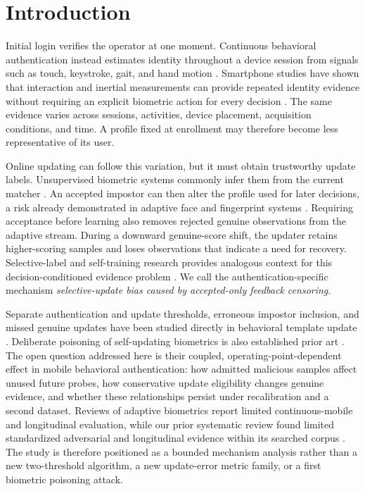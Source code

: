 \documentclass[technologies,article,submit,moreauthors]{Definitions/mdpi}
\begin{document}
\section{Introduction}\label{sec:introduction}

Initial login verifies the operator at one moment. Continuous behavioral authentication instead estimates identity throughout a device session from signals such as touch, keystroke, gait, and hand motion \cite{Mahfouz2017SmartphoneSurvey,Abuhamad2021SensorSurvey,Stylios2021MobileSurvey}. Smartphone studies have shown that interaction and inertial measurements can provide repeated identity evidence without requiring an explicit biometric action for every decision \cite{Frank2013Touchalytics,Sitova2016HMOG,Fereidooni2023AuthentiSense}. The same evidence varies across sessions, activities, device placement, acquisition conditions, and time. A profile fixed at enrollment may therefore become less representative of its user.

Online updating can follow this variation, but it must obtain trustworthy update labels. Unsupervised biometric systems commonly infer them from the current matcher \cite{Rattani2009TemplateUpdate,Didaci2014UnsupervisedUpdate}. An accepted impostor can then alter the profile used for later decisions, a risk already demonstrated in adaptive face and fingerprint systems \cite{Biggio2012PoisoningAdaptive,Biggio2013FacePoisoning,Lovisotto2020BiometricBackdoors,Xue2020LOPA}. Requiring acceptance before learning also removes rejected genuine observations from the adaptive stream. During a downward genuine-score shift, the updater retains higher-scoring samples and loses observations that indicate a need for recovery. Selective-label and self-training research provides analogous context for this decision-conditioned evidence problem \cite{Lakkaraju2017SelectiveLabels,Arazo2020ConfirmationBias,Perdomo2020PerformativePrediction}. We call the authentication-specific mechanism \emph{selective-update bias caused by accepted-only feedback censoring}.

Separate authentication and update thresholds, erroneous impostor inclusion, and missed genuine updates have been studied directly in behavioral template update \cite{Giot2011KeystrokeUpdate,Giot2012HybridTemplateUpdate,Giot2012TemplateUpdateEvaluation}. Deliberate poisoning of self-updating biometrics is also established prior art \cite{Biggio2012PoisoningAdaptive,Biggio2013FacePoisoning,Lovisotto2020BiometricBackdoors,Xue2020LOPA}. The open question addressed here is their coupled, operating-point-dependent effect in mobile behavioral authentication: how admitted malicious samples affect unused future probes, how conservative update eligibility changes genuine evidence, and whether these relationships persist under recalibration and a second dataset. Reviews of adaptive biometrics report limited continuous-mobile and longitudinal evaluation, while our prior systematic review found limited standardized adversarial and longitudinal evidence within its searched corpus \cite{Ryu2023AdaptiveBiometrics,Gali2026SystematicReview}. The study is therefore positioned as a bounded mechanism analysis rather than a new two-threshold algorithm, a new update-error metric family, or a first biometric poisoning attack.
\end{document}
